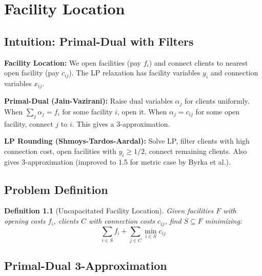 \documentclass[11pt,oneside]{book}
\newtheorem{definition}[theorem]{Definition}
\begin{document}
\setcounter{chapter}{23}
\chapter{Facility Location}
\label{ch:facility}

\section{Intuition: Primal-Dual with Filters}

\begin{intuitionbox}
\textbf{Facility Location:} We open facilities (pay $f_i$) and connect clients to nearest open facility (pay $c_{ij}$). The LP relaxation has facility variables $y_i$ and connection variables $x_{ij}$.

\textbf{Primal-Dual (Jain-Vazirani):} Raise dual variables $\alpha_j$ for clients uniformly. When $\sum_j \alpha_j = f_i$ for some facility $i$, open it. When $\alpha_j = c_{ij}$ for some open facility, connect $j$ to $i$. This gives a 3-approximation.

\textbf{LP Rounding (Shmoys-Tardos-Aardal):} Solve LP, filter clients with high connection cost, open facilities with $y_i \geq 1/2$, connect remaining clients. Also gives 3-approximation (improved to 1.5 for metric case by Byrka et al.).
\end{intuitionbox}

\section{Problem Definition}

\begin{definition}[Uncapacitated Facility Location]
Given facilities $F$ with opening costs $f_i$, clients $C$ with connection costs $c_{ij}$, find $S \subseteq F$ minimizing:
\[
\sum_{i \in S} f_i + \sum_{j \in C} \min_{i \in S} c_{ij}
\]
\end{definition}

\section{Primal-Dual 3-Approximation}
\end{document}
